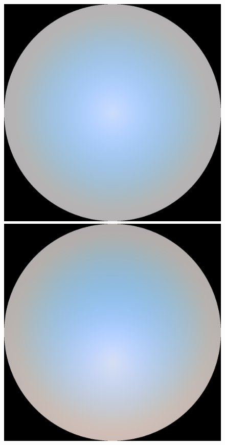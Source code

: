 \begin{figure}
{ }
 \subtop
 {
 \includegraphics[scale=0.125]{figures/preetham_sRGB_D65_turbidity_6_thetaSun_0.png}
 }
 \hfill
 \subtop
 {
 \includegraphics[scale=0.125]{figures/preetham_sRGB_D65_turbidity_6_thetaSun_30.png}
}
\end{figure}
